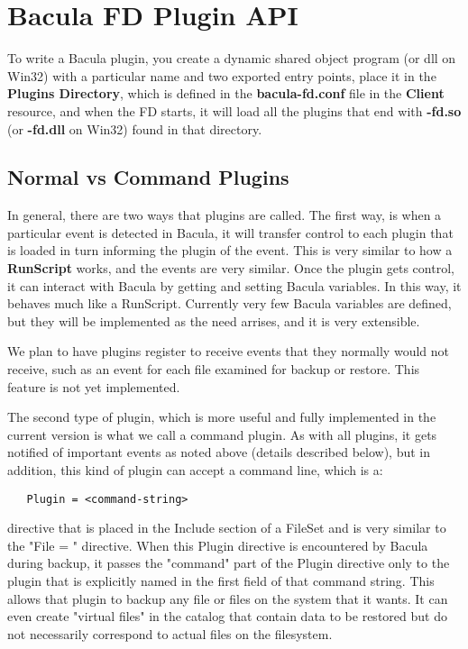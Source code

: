 
\chapter{Bacula FD Plugin API}
To write a Bacula plugin, you create a dynamic shared object program (or dll on
Win32) with a particular name and two exported entry points, place it in the
{\bf Plugins Directory}, which is defined in the {\bf bacula-fd.conf} file in
the {\bf Client} resource, and when the FD starts, it will load all the plugins
that end with {\bf -fd.so} (or {\bf -fd.dll} on Win32) found in that directory.

\section{Normal vs Command Plugins}
In general, there are two ways that plugins are called. The first way, is when
a particular event is detected in Bacula, it will transfer control to each
plugin that is loaded in turn informing the plugin of the event.  This is very
similar to how a {\bf RunScript} works, and the events are very similar.  Once
the plugin gets control, it can interact with Bacula by getting and setting
Bacula variables.  In this way, it behaves much like a RunScript.  Currently
very few Bacula variables are defined, but they will be implemented as the need
arrises, and it is very extensible.

We plan to have plugins register to receive events that they normally would
not receive, such as an event for each file examined for backup or restore.
This feature is not yet implemented.

The second type of plugin, which is more useful and fully implemented in the
current version is what we call a command plugin.  As with all plugins, it gets
notified of important events as noted above (details described below), but in
addition, this kind of plugin can accept a command line, which is a:

\begin{verbatim}
   Plugin = <command-string>
\end{verbatim}

directive that is placed in the Include section of a FileSet and is very
similar to the "File = " directive.  When this Plugin directive is encountered
by Bacula during backup, it passes the "command" part of the Plugin directive
only to the plugin that is explicitly named in the first field of that command
string.  This allows that plugin to backup any file or files on the system that
it wants. It can even create "virtual files" in the catalog that contain data
to be restored but do not necessarily correspond to actual files on the
filesystem.

